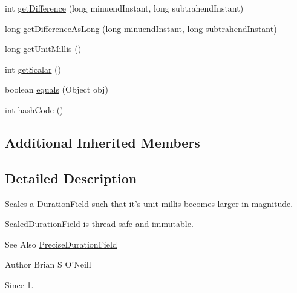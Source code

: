 \begin{DoxyCompactItemize}
int \hyperlink{classorg_1_1joda_1_1time_1_1field_1_1_scaled_duration_field_a9a52315080457ac342de2f0dbd53acd4}{get\-Difference} (long minuend\-Instant, long subtrahend\-Instant)
\item 
long \hyperlink{classorg_1_1joda_1_1time_1_1field_1_1_scaled_duration_field_ad0860ff0cca09d702f2b3b7eab88e06d}{get\-Difference\-As\-Long} (long minuend\-Instant, long subtrahend\-Instant)
\item 
long \hyperlink{classorg_1_1joda_1_1time_1_1field_1_1_scaled_duration_field_a287a12fa844f8b713d3954624409862f}{get\-Unit\-Millis} ()
\item 
int \hyperlink{classorg_1_1joda_1_1time_1_1field_1_1_scaled_duration_field_accb082debce82f4c07f9615f0c9c8eb7}{get\-Scalar} ()
\item 
boolean \hyperlink{classorg_1_1joda_1_1time_1_1field_1_1_scaled_duration_field_a2f43069b985956e9a1228fe21df360ce}{equals} (Object obj)
\item 
int \hyperlink{classorg_1_1joda_1_1time_1_1field_1_1_scaled_duration_field_a648c68f0ee6cd8bf84196ed974b2eede}{hash\-Code} ()
\end{DoxyCompactItemize}
\subsection*{Additional Inherited Members}


\subsection{Detailed Description}
Scales a \hyperlink{classorg_1_1joda_1_1time_1_1_duration_field}{Duration\-Field} such that it's unit millis becomes larger in magnitude. 

\hyperlink{classorg_1_1joda_1_1time_1_1field_1_1_scaled_duration_field}{Scaled\-Duration\-Field} is thread-\/safe and immutable.

\begin{DoxySeeAlso}{See Also}
\hyperlink{classorg_1_1joda_1_1time_1_1field_1_1_precise_duration_field}{Precise\-Duration\-Field}
\end{DoxySeeAlso}
\begin{DoxyAuthor}{Author}
Brian S O'Neill 
\end{DoxyAuthor}
\begin{DoxySince}{Since}
1. 
\end{DoxySince}


